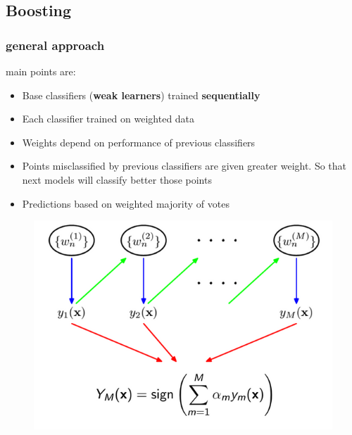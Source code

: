 \subsection{Boosting}
\subsubsection{general approach}
main points are:
\begin{itemize}
    \item Base classifiers (\textbf{weak learners}) trained \textbf{sequentially}
    \item Each classifier trained on weighted data
    \item Weights depend on performance of previous classifiers
    \item Points misclassified by previous classifiers are given greater weight. So that next models will classify better those points
    \item Predictions based on weighted majority of votes
\end{itemize}
\begin{figure}[H]
    \centering
    \includegraphics[width=15cm]{images/boosting/boosting.png}
    \label{fig:booting}
\end{figure}

